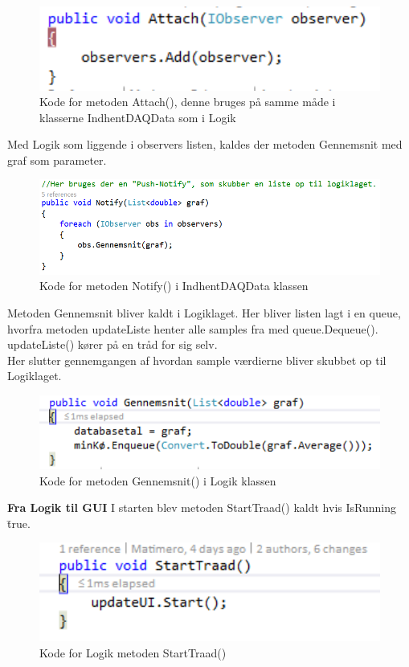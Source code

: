 \begin{figure}[H]
	\centering
	\includegraphics[width=1.0\textwidth]{FigurerProgram/AttachDaq}
	\caption{Kode for metoden Attach(), denne bruges på samme måde i klasserne IndhentDAQData som i Logik}
\end{figure}

Med Logik som liggende i observers listen, kaldes der metoden Gennemsnit med graf som parameter.

\begin{figure}[H]
	\centering
	\includegraphics[width=1.0\textwidth]{FigurerProgram/NotifyDaq}
	\caption{Kode for metoden Notify() i IndhentDAQData klassen}
\end{figure}

Metoden Gennemsnit bliver kaldt i Logiklaget. Her bliver listen lagt i en queue, hvorfra metoden updateListe henter alle samples fra med queue.Dequeue(). updateListe() kører på en tråd for sig selv.
\\Her slutter gennemgangen af hvordan sample værdierne bliver skubbet op til Logiklaget.

\begin{figure}[H]
	\centering
	\includegraphics[width=1.0\textwidth]{FigurerProgram/GennemsnitLogik}
	\caption{Kode for metoden Gennemsnit() i Logik klassen}
\end{figure}

\textbf{Fra Logik til GUI}
I starten blev metoden StartTraad() kaldt hvis IsRunning \= true.
\begin{figure}[H]
	\centering
	\includegraphics[width=1.0\textwidth]{FigurerProgram/StartTraad}
	\caption{Kode for Logik metoden StartTraad()}
\end{figure}


